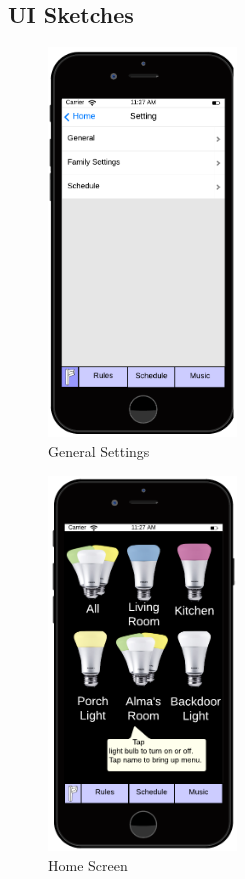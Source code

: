 \documentclass[12pt]{article}
\begin{document}
\subsection{UI Sketches}
  \begin{figure}[ht!]
    \centering
    \includegraphics[width=50mm]{Settings.png}
    \caption{General Settings}
    \label{fig:settings}
  \end{figure}
  
  \begin{figure}[ht!]
    \centering
    \includegraphics[width=50mm]{Home.png}
    \caption{Home Screen}
    \label{fig:home}
  \end{figure}
  
\end{document}
